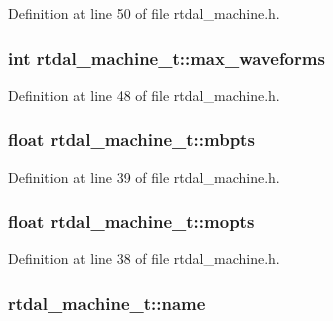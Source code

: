 Definition at line 50 of file rtdal\-\_\-machine.\-h.

\hypertarget{structrtdal__machine__t_a1603a33417a4f3f624aa59074d18348a}{
\subsubsection[{max\-\_\-waveforms}]{\setlength{\rightskip}{0pt plus 5cm}int rtdal\-\_\-machine\-\_\-t\-::max\-\_\-waveforms}}\label{structrtdal__machine__t_a1603a33417a4f3f624aa59074d18348a}


Definition at line 48 of file rtdal\-\_\-machine.\-h.

\hypertarget{structrtdal__machine__t_a6414f7323760791df8a76ec90fcd5582}{
\subsubsection[{mbpts}]{\setlength{\rightskip}{0pt plus 5cm}float rtdal\-\_\-machine\-\_\-t\-::mbpts}}\label{structrtdal__machine__t_a6414f7323760791df8a76ec90fcd5582}


Definition at line 39 of file rtdal\-\_\-machine.\-h.

\hypertarget{structrtdal__machine__t_ac62f1bb089d649bb9cf5ad2d1c2e9d50}{
\subsubsection[{mopts}]{\setlength{\rightskip}{0pt plus 5cm}float rtdal\-\_\-machine\-\_\-t\-::mopts}}\label{structrtdal__machine__t_ac62f1bb089d649bb9cf5ad2d1c2e9d50}


Definition at line 38 of file rtdal\-\_\-machine.\-h.

\hypertarget{structrtdal__machine__t_a13c3d54f7150506a281019950397e605}{
\subsubsection[{name}]{ rtdal\-\_\-machine\-\_\-t\-::name}}\label{structrtdal__machine__t_a13c3d54f7150506a281019950397e605}


